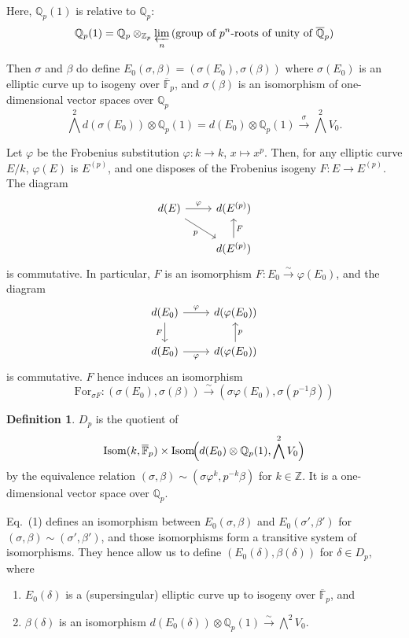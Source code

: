 \documentclass[11pt,a4paper]{article}
\theoremstyle{plain}
\theoremstyle{definition}
\newtheorem{definition}[theorem]{Definition}
\theoremstyle{remark}
\DeclareMathOperator{\Isom}{Isom}
\newcommand{\Z}{\mathbb{Z}}
\newcommand{\Qpbar}{\overline{\mathbb{Q}}_{p}}
\newcommand{\Fpbar}{\overline{\mathbb{F}}_{p}}
\newcommand{\Zp}{\mathbb{Z}_{p}}
\newcommand{\Qp}{\mathbb{Q}_{p}}
\begin{document}
Here, $\Qp(1)$ is relative to $\Qp$:
\[
\Qp(1) = \Qp \otimes_{\Zp} \varprojlim_{n} \text{(group of $p^{n}$-roots of unity of $\Qpbar$)}
\]

Then $\sigma$ and $\beta$ do define $E_{0}(\sigma, \beta) = (\sigma(E_{0}), \sigma(\beta))$ where $\sigma(E_{0})$ is an elliptic curve up to isogeny over $\Fpbar$, and $\sigma(\beta)$ is an isomorphism of one-dimensional vector spaces over $\Qp$
\[
\bigwedge^{2} d(\sigma(E_{0})) \otimes \Qp(1) = d(E_{0}) \otimes \Qp(1) \xrightarrow{\sigma} \bigwedge^{2} V_{0}.
\]

Let $\varphi$ be the Frobenius substitution $\varphi : k \to k$, $x \mapsto x^{p}$. Then, for any elliptic curve $E/k$, $\varphi(E)$ is $E^{(p)}$, and one disposes of the Frobenius isogeny $F : E \to E^{(p)}$.
The diagram
\[
\begin{tikzcd}
d(E) \arrow[dr, "p"'] \arrow[r, "\varphi"] & d(E^{(p)}) \\
& d(E^{(p)}) \arrow[u, "F"']
\end{tikzcd}
\]
is commutative. In particular, $F$ is an isomorphism $F : E_{0} \xrightarrow{\sim} \varphi(E_{0})$, and the diagram
\[
\begin{tikzcd}
d(E_{0}) \arrow[r, "\varphi"] \arrow[d, "F"'] & d(\varphi(E_{0})) \\
d(E_{0}) \arrow[r, "\varphi"'] & d(\varphi(E_{0})) \arrow[u, "p"']
\end{tikzcd}
\]
is commutative. $F$ hence induces an isomorphism
\[
\mathrm{For}_{\sigma F} : (\sigma(E_{0}), \sigma(\beta)) \xrightarrow{\sim} (\sigma\varphi(E_{0}), \sigma(p^{-1}\beta))
\tag{1}
\]

\begin{definition}
$D_{p}$ is the quotient of
\[
\Isom(k, \Fpbar) \times \Isom\!\Bigl(d(E_{0}) \otimes \Qp(1), \bigwedge^{2} V_{0}\Bigr)
\]
by the equivalence relation $(\sigma, \beta) \sim (\sigma\varphi^{k}, p^{-k}\beta)$ for $k \in \Z$. It is a one-dimensional vector space over $\Qp$.
\end{definition}

Eq.\ (1) defines an isomorphism between $E_{0}(\sigma, \beta)$ and $E_{0}(\sigma', \beta')$ for $(\sigma, \beta) \sim (\sigma', \beta')$, and those isomorphisms form a transitive system of isomorphisms. They hence allow us to define $(E_{0}(\delta), \beta(\delta))$ for $\delta \in D_{p}$, where
\begin{enumerate}[label=(\alph*)]
\item $E_{0}(\delta)$ is a (supersingular) elliptic curve up to isogeny over $\Fpbar$, and
\item $\beta(\delta)$ is an isomorphism $d(E_{0}(\delta)) \otimes \Qp(1) \xrightarrow{\sim} \bigwedge^{2} V_{0}$.
\end{enumerate}
\end{document}
